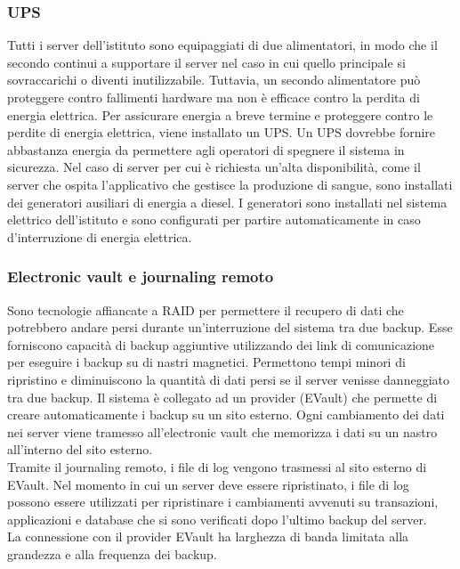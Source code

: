 \documentclass[12pt, a4paper, titlepage]{report}
\newcommand{\vaultVendor}{EVault} %
\begin{document}
	\subsubsection{UPS}
	
	Tutti i server dell'istituto sono equipaggiati di due alimentatori, in modo che il secondo continui a supportare il server nel caso in cui quello principale si sovraccarichi o diventi inutilizzabile. Tuttavia, un secondo alimentatore può proteggere contro fallimenti hardware ma non è efficace contro la perdita di energia elettrica. Per assicurare energia a breve termine e proteggere contro le perdite di energia elettrica, viene installato un UPS. Un UPS dovrebbe fornire abbastanza energia da permettere agli operatori di spegnere il sistema in sicurezza. Nel caso di server per cui è richiesta un'alta disponibilità, come il server che ospita l'applicativo che gestisce la produzione di sangue, sono installati dei generatori ausiliari di energia a diesel. I generatori sono installati nel sistema elettrico dell'istituto e sono configurati per partire automaticamente in caso d'interruzione di energia elettrica.
	
	\subsubsection{Electronic vault e journaling remoto}
	
	Sono tecnologie affiancate a RAID per permettere il recupero di dati che potrebbero andare persi durante un'interruzione del sistema tra due backup. Esse forniscono capacità di backup aggiuntive utilizzando dei link di comunicazione per eseguire i backup su di nastri magnetici. Permettono tempi minori di ripristino e diminuiscono la quantità di dati persi se il server venisse danneggiato tra due backup. Il sistema è collegato ad un provider (\vaultVendor) che permette di creare automaticamente i backup su un sito esterno. Ogni cambiamento dei dati nei server viene tramesso all'electronic vault che memorizza i dati su un nastro all'interno del sito esterno.\\
	Tramite il journaling remoto, i file di log vengono trasmessi al sito esterno di \vaultVendor. Nel momento in cui un server deve essere ripristinato, i file di log possono essere utilizzati per ripristinare i cambiamenti avvenuti su transazioni, applicazioni e database che si sono verificati dopo l'ultimo backup del server.\\
	La connessione con il provider \vaultVendor{} ha larghezza di banda limitata alla grandezza e alla frequenza dei backup.
	
\end{document}
